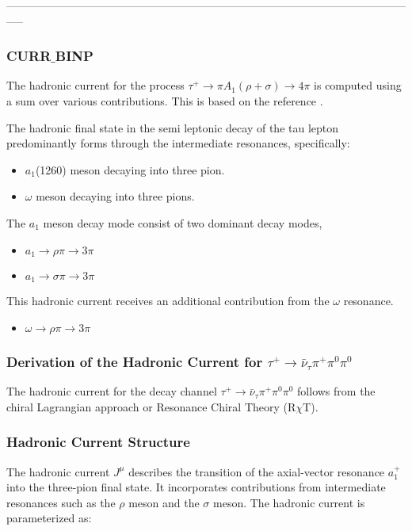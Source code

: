 \documentclass[12pt]{article}
\begin{document}
-----------------------------------------------------------------------------------------------------------------\\


\subsubsection{CURR$\_$BINP}
The hadronic current for the process $\tau^+ \to \pi A_1 (\rho + \sigma) \to 4\pi$ is computed using a sum over various contributions. This is based on the reference \cite{hep-ph/0201149}.

The hadronic final state in the semi leptonic decay of the tau lepton predominantly forms through the intermediate resonances, specifically:
\begin{itemize}
\item \(a_1\)(1260) meson decaying into three pion.
\item $\omega $ meson decaying into three pions.
\end{itemize}


The $a_1$ meson decay mode consist of two dominant decay modes, 
\begin{itemize}
\item \(a_1 \to \rho \pi \to 3\pi\)
\item \(a_1 \to \sigma \pi \to 3\pi\)
\end{itemize}

This hadronic current receives an additional contribution from the $\omega$ resonance. 
\begin{itemize}
\item \(\omega \to \rho \pi \to 3\pi\)
\end{itemize}
\subsubsection*{Derivation of the Hadronic Current for $\tau^+ \to \bar{\nu}_{\tau} \pi^+ \pi^0 \pi^0$}

The hadronic current for the decay channel $\tau^+ \to \bar{\nu}_{\tau} \pi^+ \pi^0 \pi^0$ follows from the chiral Lagrangian approach or Resonance Chiral Theory (R$\chi$T). 

\subsubsection*{Hadronic Current Structure}
The hadronic current $J^\mu$ describes the transition of the axial-vector resonance $a_1^+$ into the three-pion final state. It incorporates contributions from intermediate resonances such as the $\rho$ meson and the $\sigma$ meson. The hadronic current is parameterized as:
\end{document}
